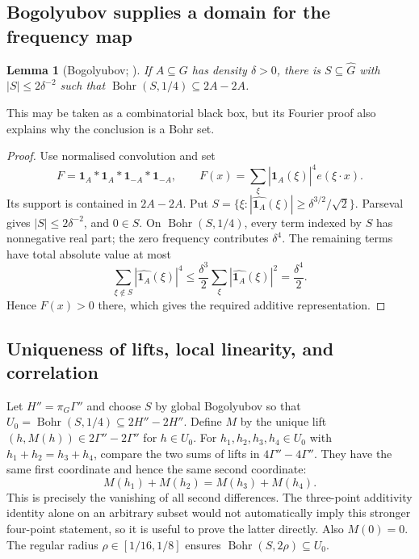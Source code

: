 \documentclass[11pt,a4paper]{article}
\newcommand{\Gh}{\widehat G}
\newcommand{\Bohr}{\operatorname{Bohr}}
\newcommand{\GT}[1]{\cite[#1]{GT}}
\newtheorem{lemma}{Lemma}[section]
\theoremstyle{definition}
\numberwithin{equation}{section}
\begin{document}
\subsection{Bogolyubov supplies a domain for the frequency map}
\begin{lemma}[Bogolyubov; {\GT{Lemma 6.3}}]\label{lem:bogolyubov}
If $A\subseteq G$ has density $\delta>0$, there is $S\subseteq\Gh$
with $|S|\leq2\delta^{-2}$ such that
$\Bohr(S,1/4)\subseteq2A-2A$.
\end{lemma}
This may be taken as a combinatorial black box, but its Fourier proof
also explains why the conclusion is a Bohr set.
\begin{proof}
Use normalised convolution and set
\[
F=\mathbf1_A*\mathbf1_A*\mathbf1_{-A}*\mathbf1_{-A},\qquad
F(x)=\sum_\xi|\widehat{\mathbf1_A}(\xi)|^4e(\xi\cdot x).
\]
Its support is contained in $2A-2A$. Put
$S=\{\xi:|\widehat{\mathbf1_A}(\xi)|\geq\delta^{3/2}/\sqrt2\}$.
Parseval gives $|S|\leq2\delta^{-2}$, and $0\in S$. On
$\Bohr(S,1/4)$, every term indexed by $S$ has nonnegative real part;
the zero frequency contributes $\delta^4$. The remaining terms have
total absolute value at most
\[
\sum_{\xi\notin S}|\widehat{\mathbf1_A}(\xi)|^4
\leq\frac{\delta^3}{2}\sum_\xi|\widehat{\mathbf1_A}(\xi)|^2
=\frac{\delta^4}{2}.
\]
Hence $F(x)>0$ there, which gives the required additive representation.
\end{proof}

\subsection{Uniqueness of lifts, local linearity, and correlation}
Let $H''=\pi_G\Gamma''$ and choose $S$ by global Bogolyubov so that
$U_0=\Bohr(S,1/4)\subseteq2H''-2H''$. Define $M$ by the unique
lift $(h,M(h))\in2\Gamma''-2\Gamma''$ for $h\in U_0$.
For $h_1,h_2,h_3,h_4\in U_0$ with $h_1+h_2=h_3+h_4$, compare the
two sums of lifts in $4\Gamma''-4\Gamma''$. They have the same first
coordinate and hence the same second coordinate:
\[M(h_1)+M(h_2)=M(h_3)+M(h_4).\]
This is precisely the vanishing of all second differences. The
three-point additivity identity alone on an arbitrary subset would not
automatically imply this stronger four-point statement, so it is useful
to prove the latter directly. Also $M(0)=0$. The regular radius
$\rho\in[1/16,1/8]$ ensures $\Bohr(S,2\rho)\subseteq U_0$.
\end{document}
